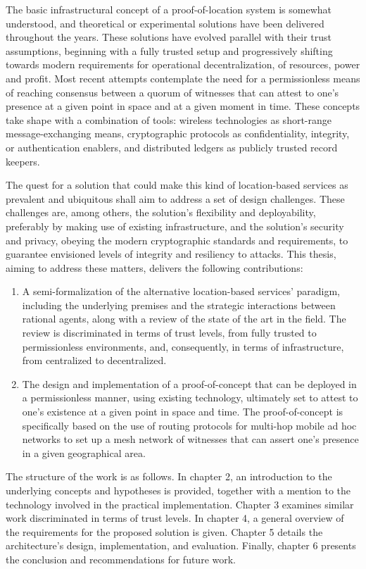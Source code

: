 The basic infrastructural concept of a proof-of-location system is somewhat understood, and theoretical or experimental solutions have been delivered throughout the years. These solutions have evolved parallel with their trust assumptions, beginning with a fully trusted setup and progressively shifting towards modern requirements for operational decentralization, of resources, power and profit. Most recent attempts contemplate the need for a permissionless means of reaching consensus between a quorum of witnesses that can attest to one's presence at a given point in space and at a given moment in time. These concepts take shape with a combination of tools: wireless technologies as short-range message-exchanging means, cryptographic protocols as confidentiality, integrity, or authentication enablers, and distributed ledgers as publicly trusted record keepers. 

The quest for a solution that could make this kind of location-based services as prevalent and ubiquitous shall aim to address a set of design challenges. These challenges are, among others, the solution's flexibility and deployability, preferably by making use of existing infrastructure, and the solution's security and privacy, obeying the modern cryptographic standards and requirements, to guarantee envisioned levels of integrity and resiliency to attacks. This thesis, aiming to address these matters, delivers the following contributions:
\begin{enumerate}
\item A semi-formalization of the alternative location-based services' paradigm, including the underlying premises and the strategic interactions between rational agents, along with a review of the state of the art in the field. The review is discriminated in terms of trust levels, from fully trusted to permissionless environments, and, consequently, in terms of infrastructure, from centralized to decentralized.
\item The design and implementation of a proof-of-concept that can be deployed in a permissionless manner, using existing technology, ultimately set to attest to one's existence at a given point in space and time. The proof-of-concept is specifically based on the use of routing protocols for multi-hop mobile ad hoc networks to set up a mesh network of witnesses that can assert one's presence in a given geographical area.
\end{enumerate}

The structure of the work is as follows. In chapter 2, an introduction to the underlying concepts and hypotheses is provided, together with a mention to the technology involved in the practical implementation. Chapter 3 examines similar work discriminated in terms of trust levels. In chapter 4, a general overview of the requirements for the proposed solution is given. Chapter 5 details the architecture's design, implementation, and evaluation. Finally, chapter 6 presents the conclusion and recommendations for future work.
